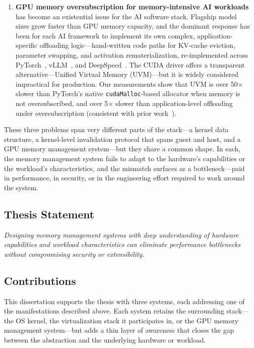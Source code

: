 \begin{enumerate}
\item \textbf{GPU memory oversubscription for memory-intensive AI workloads}
    has become an existential issue for the AI software stack.
    Flagship model sizes grow faster than GPU memory capacity, and the dominant
    response has been for each AI framework to implement its own complex,
    application-specific offloading logic---hand-written code paths for
    KV-cache eviction, parameter swapping, and activation rematerialization,
    re-implemented across PyTorch~\cite{pytorch}, vLLM~\cite{vllm}, and DeepSpeed~\cite{deepspeed}.
    The CUDA driver offers a transparent alternative---Unified
    Virtual Memory (UVM)---but it is widely considered impractical for
    production.
    Our measurements show that UVM is over 50$\times$ slower than PyTorch's
    native \texttt{cudaMalloc}-based allocator when memory is not oversubscribed,
    and over 5$\times$ slower than application-level offloading under
    oversubscription (consistent with prior work~\cite{infinigen}).
\end{enumerate}

These three problems span very different parts of the stack---a kernel data
structure, a kernel-level invalidation protocol that spans guest and host,
and a GPU memory management system---but they share a common shape.
In each, the memory management system fails to adapt to the hardware's
capabilities or the workload's characteristics, and the mismatch surfaces as a
bottleneck---paid in performance, in security, or in the engineering effort
required to work around the system.

\subsection{Thesis Statement}

\noindent\emph{Designing memory management systems with deep understanding of
hardware capabilities and workload characteristics can eliminate performance
bottlenecks without compromising security or extensibility.}

\subsection{Contributions}

This dissertation supports the thesis with three systems, each addressing one of
the manifestations described above.
Each system retains the surrounding stack---the OS kernel, the virtualization
stack it participates in, or the GPU memory management system---but adds a thin
layer of awareness that closes the gap between the abstraction and the underlying
hardware or workload.

